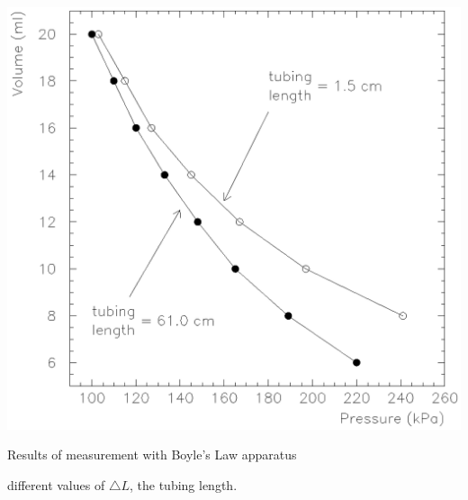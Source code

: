 \vspace{0.3cm}
{\par\centering \includegraphics{boyleslawfig2.eps} \par}
\vspace{0.3cm}

{\par\centering Results of measurement with Boyle's Law apparatus \par}

{\par\centering different values of \( \triangle L \), the tubing length.\par}

